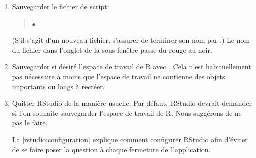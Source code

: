 \begin{enumerate}
\begin{quote}
  \end{quote}
\item Sauvegarder le fichier de script:
  \begin{quote}
     $\bullet$ 
  \end{quote}
  (S'il s'agit d'un nouveau fichier, s'assurer de terminer son nom par
  .) Le nom du fichier dans l'onglet de la sous-fenêtre passe
  du rouge au noir.
\item Sauvegarder si désiré l'espace de travail de R avec
  . Cela n'est
  habituellement pas nécessaire à moins que l'espace de travail ne
  contienne des objets importants ou longs à recréer.
\item Quitter RStudio de la manière usuelle. Par défaut, RStudio
  devrait demander si l'on souhaite sauvegarder l'espace de travail de
  R. Nous suggérons de ne pas le faire.

  La \autoref{rstudio:configuration} explique comment configurer
  RStudio afin d'éviter de se faire poser la question à chaque
  fermeture de l'application.
\end{enumerate}



